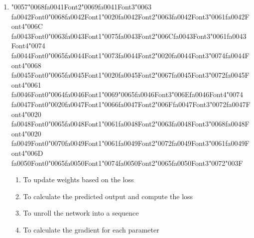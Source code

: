 \documentclass[12pt]{article}
\begin{document}
\begin{enumerate}[label=Q\arabic*.]
\item {\char"0057}{\char"0068}{\csname fa0041Font2\endcsname\char"0069}{\csname fa0041Font3\endcsname\char"0063} {\csname fa0042Font0\endcsname\char"0068}{\csname fa0042Font1\endcsname\char"0020}{\csname fa0042Font2\endcsname\char"0063}{\csname fa0042Font3\endcsname\char"0061}{\csname fa0042Font4\endcsname\char"006C} {\csname fa0043Font0\endcsname\char"0063}{\csname fa0043Font1\endcsname\char"0075}{\csname fa0043Font2\endcsname\char"006C}{\csname fa0043Font3\endcsname\char"0061}{\csname fa0043Font4\endcsname\char"0074} {\csname fa0044Font0\endcsname\char"0065}{\csname fa0044Font1\endcsname\char"0073}{\csname fa0044Font2\endcsname\char"0020}{\csname fa0044Font3\endcsname\char"0074}{\csname fa0044Font4\endcsname\char"0068} {\csname fa0045Font0\endcsname\char"0065}{\csname fa0045Font1\endcsname\char"0020}{\csname fa0045Font2\endcsname\char"0067}{\csname fa0045Font3\endcsname\char"0072}{\csname fa0045Font4\endcsname\char"0061} {\csname fa0046Font0\endcsname\char"0064}{\csname fa0046Font1\endcsname\char"0069}{\char"0065}{\csname fa0046Font3\endcsname\char"006E}{\csname fa0046Font4\endcsname\char"0074} {\csname fa0047Font0\endcsname\char"0020}{\csname fa0047Font1\endcsname\char"0066}{\csname fa0047Font2\endcsname\char"006F}{\csname fa0047Font3\endcsname\char"0072}{\csname fa0047Font4\endcsname\char"0020} {\csname fa0048Font0\endcsname\char"0065}{\csname fa0048Font1\endcsname\char"0061}{\csname fa0048Font2\endcsname\char"0063}{\csname fa0048Font3\endcsname\char"0068}{\csname fa0048Font4\endcsname\char"0020} {\csname fa0049Font0\endcsname\char"0070}{\csname fa0049Font1\endcsname\char"0061}{\csname fa0049Font2\endcsname\char"0072}{\csname fa0049Font3\endcsname\char"0061}{\csname fa0049Font4\endcsname\char"006D} {\csname fa0050Font0\endcsname\char"0065}{\csname fa0050Font1\endcsname\char"0074}{\csname fa0050Font2\endcsname\char"0065}{\csname fa0050Font3\endcsname\char"0072}{\char"003F}
\begin{enumerate}[label=(\Alph*)]
    \item To update weights based on the loss
    \item To calculate the predicted output and compute the loss
    \item To unroll the network into a sequence
    \item To calculate the gradient for each parameter
\end{enumerate}

\end{enumerate}
\end{document}
